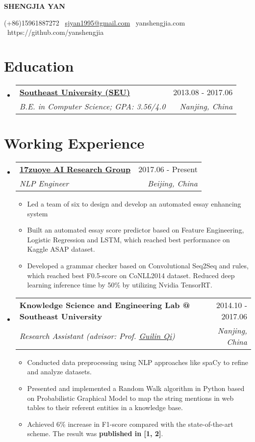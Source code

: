 \documentclass[letterpaper, 11pt]{article}
\makeatletter
\newcommand{\resumeSingleSubItem}[1]{
   \item\small{#1} \vspace{-3pt}
}
\newcommand{\resumeSubheading}[4]{
  \vspace{-2pt}\item
    \begin{tabular*}{0.97\textwidth}[t]{l@{\extracolsep{\fill}}r}
      \textbf{#1} & #2 \\
      \textit{\small#3} & \textit{\small #4} \\
    \end{tabular*}\vspace{-7pt}
}
\newcommand{\resumeSubHeadingListStart}{\begin{itemize}[leftmargin=*]}
\newcommand{\resumeSubHeadingListEnd}{\end{itemize}\vspace{-10pt}}
\newcommand{\resumeItemListStart}{\begin{itemize}[leftmargin=*]}
\newcommand{\resumeItemListEnd}{\end{itemize}\vspace{-5pt}}
\newcommand{\name}[1]{
  \centerline{\huge \textbf{#1}}
  \vspace{1.25ex}
}
\makeatother
\begin{document}
\name{SHENGJIA YAN}
\centerline{(+86)15961887272 \textperiodcentered\ \href{mailto:sjyan1995@gmail.com}{sjyan1995@gmail.com} \textperiodcentered\ yanshengjia.com \textperiodcentered\ https://github.com/yanshengjia}


\section{Education}
    \resumeSubHeadingListStart
        \resumeSubheading
        {\href{http://www.seu.edu.cn/}{Southeast University (SEU)}}{2013.08 - 2017.06}
        {B.E. in Computer Science;  GPA: 3.56/4.0}{Nanjing, China}
    \resumeSubHeadingListEnd


\section{Working Experience}
    \resumeSubHeadingListStart

    \resumeSubheading
        {\href{https://17zuoye.com}{17zuoye AI Research Group}}{2017.06 - Present}
        {NLP Engineer}{Beijing, China}
        \resumeItemListStart
            \resumeSingleSubItem{Led a team of six to design and develop an automated essay enhancing system}
            \resumeSingleSubItem{Built an automated essay score predictor based on Feature Engineering, Logistic Regression and LSTM, which reached best performance on Kaggle ASAP dataset.}
            \resumeSingleSubItem{Developed a grammar checker based on Convolutional Seq2Seq and rules, which reached best F0.5-score on CoNLL2014 dataset. Reduced deep learning inference time by 50\% by utilizing Nvidia TensorRT.}
        \resumeItemListEnd

    \resumeSubheading
        {Knowledge Science and Engineering Lab @ Southeast University}{2014.10 - 2017.06}
        {Research Assistant (advisor: Prof. \href{http://cse.seu.edu.cn/PersonalPage/qgl/index.htm}{Guilin Qi})}{Nanjing, China}
        \resumeItemListStart
            \resumeSingleSubItem
                {Conducted data preprocessing using NLP approaches like spaCy to refine and analyze datasets.}
            \resumeSingleSubItem
                {Presented and implemented a Random Walk algorithm in Python based on Probabilistic Graphical Model to map the string mentions in web tables to their referent entities in a knowledge base.}
            \resumeSingleSubItem
                {Achieved 6\% increase in F1-score compared with the state-of-the-art scheme. The result was \textbf{published in [1, 2]}.}
        \resumeItemListEnd
    \resumeSubHeadingListEnd
\end{document}
